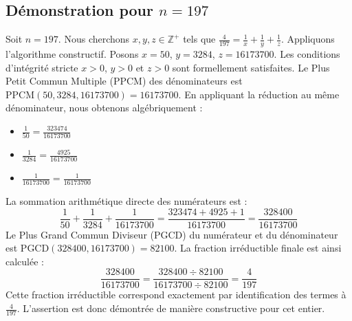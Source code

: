 \documentclass[11pt,a4paper]{article}
\begin{document}
\subsection{Démonstration pour $n = 197$}
Soit $n = 197$. Nous cherchons $x, y, z \in \mathbb{Z}^{+}$ tels que $\frac{4}{197} = \frac{1}{x} + \frac{1}{y} + \frac{1}{z}$.
Appliquons l'algorithme constructif. Posons $x = 50$, $y = 3284$, $z = 16173700$.
Les conditions d'intégrité stricte $x > 0$, $y > 0$ et $z > 0$ sont formellement satisfaites.
Le Plus Petit Commun Multiple (PPCM) des dénominateurs est $\text{PPCM}(50, 3284, 16173700) = 16173700$.
En appliquant la réduction au même dénominateur, nous obtenons algébriquement :
\begin{itemize}
    \item $\frac{1}{50} = \frac{323474}{16173700}$
    \item $\frac{1}{3284} = \frac{4925}{16173700}$
    \item $\frac{1}{16173700} = \frac{1}{16173700}$
\end{itemize}
La sommation arithmétique directe des numérateurs est :
$$ \frac{1}{50} + \frac{1}{3284} + \frac{1}{16173700} = \frac{323474 + 4925 + 1}{16173700} = \frac{328400}{16173700} $$
Le Plus Grand Commun Diviseur (PGCD) du numérateur et du dénominateur est $\text{PGCD}(328400, 16173700) = 82100$.
La fraction irréductible finale est ainsi calculée :
$$ \frac{328400}{16173700} = \frac{328400 \div 82100}{16173700 \div 82100} = \frac{4}{197} $$
Cette fraction irréductible correspond exactement par identification des termes à $\frac{4}{197}$. L'assertion est donc démontrée de manière constructive pour cet entier.
\end{document}
